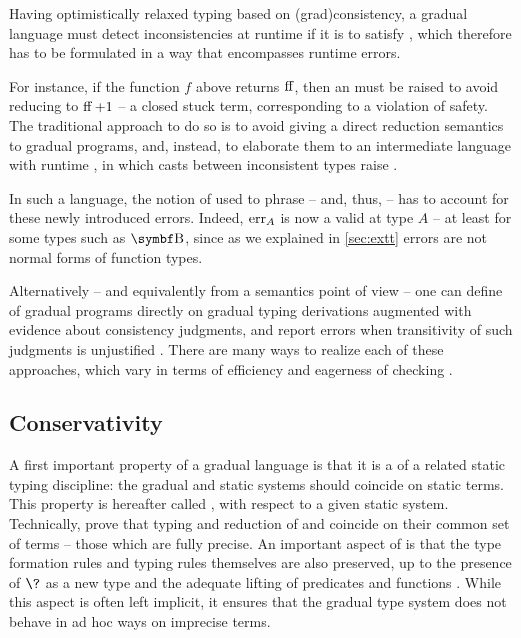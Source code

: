Having optimistically relaxed typing based on \kl(grad){consistency},
a gradual language must detect inconsistencies at runtime if it is to satisfy ,
which therefore has to be formulated in a way that encompasses runtime errors.

\AP For instance, if the function $f$ above returns $\operatorname{ff}$,
then an  must be raised to avoid reducing to $\operatorname{ff} + 1$ – a closed stuck term,
corresponding to a violation of safety.
The traditional approach to do so is to avoid giving a direct reduction semantics to gradual
programs, and, instead, to elaborate them to an intermediate language with runtime ,
in which casts between inconsistent types raise %
.

In such a language, the notion of  used to phrase  – and,
thus,  – has to account for these newly introduced errors. Indeed, $\err[A]$
is now a valid  at type $A$ – at least for some types such as $\Bool$,
since as we explained in \cref{sec:extt}  errors are not normal forms of
function types.

Alternatively – and equivalently from a semantics point of view – one can define 
of gradual programs directly on gradual typing derivations augmented with evidence about
consistency judgments, and report errors when transitivity of such judgments is
unjustified .
There are many ways to realize each of these approaches,
which vary in terms of efficiency and eagerness of checking .

\subsection{Conservativity}
\AP A first important property of a gradual language is that it is a
 of a related static typing discipline:
the gradual and static systems should coincide on static terms.
This property is hereafter called ,
with respect to a given static system.
Technically,  prove that typing and reduction of  and
 coincide on their common set of terms – \ie those which are fully precise.
An important aspect of  is that the type formation rules and typing
rules themselves are also preserved, up to the presence of $\?$ as a new type and the
adequate lifting of predicates and functions .
While this aspect is often left implicit, it ensures that the gradual type system does not
behave in ad hoc ways on imprecise terms.

